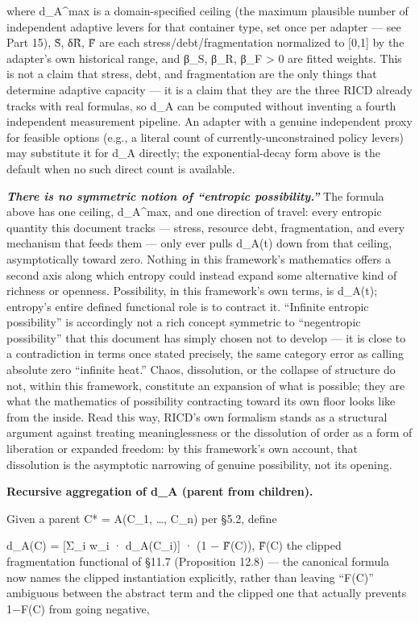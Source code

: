 \documentclass[
]{article}
\begin{document}
where d\_A\^{}max is a domain-specified ceiling (the maximum plausible
number of independent adaptive levers for that container type, set once
per adapter --- see Part 15), S̃, δR̃, F̃ are each
stress/debt/fragmentation normalized to {[}0,1{]} by the adapter's own
historical range, and β\_S, β\_R, β\_F \textgreater{} 0 are fitted
weights. This is not a claim that stress, debt, and fragmentation are
the only things that determine adaptive capacity --- it is a claim that
they are the three RICD already tracks with real formulas, so d\_A can
be computed without inventing a fourth independent measurement pipeline.
An adapter with a genuine independent proxy for feasible options (e.g.,
a literal count of currently-unconstrained policy levers) may substitute
it for d\_A directly; the exponential-decay form above is the default
when no such direct count is available.

\emph{\textbf{There is no symmetric notion of ``entropic
possibility.''}} The formula above has one ceiling, d\_A\^{}max, and one
direction of travel: every entropic quantity this document tracks ---
stress, resource debt, fragmentation, and every mechanism that feeds
them --- only ever pulls d\_A(t) down from that ceiling, asymptotically
toward zero. Nothing in this framework's mathematics offers a second
axis along which entropy could instead expand some alternative kind of
richness or openness. Possibility, in this framework's own terms, is
d\_A(t); entropy's entire defined functional role is to contract it.
``Infinite entropic possibility'' is accordingly not a rich concept
symmetric to ``negentropic possibility'' that this document has simply
chosen not to develop --- it is close to a contradiction in terms once
stated precisely, the same category error as calling absolute zero
``infinite heat.'' Chaos, dissolution, or the collapse of structure do
not, within this framework, constitute an expansion of what is possible;
they are what the mathematics of possibility contracting toward its own
floor looks like from the inside. Read this way, RICD's own formalism
stands as a structural argument against treating meaninglessness or the
dissolution of order as a form of liberation or expanded freedom: by
this framework's own account, that dissolution is the asymptotic
narrowing of genuine possibility, not its opening.

\textbf{Recursive aggregation of d\_A (parent from children).}

Given a parent C* = A(C\_1, \ldots, C\_n) per §5.2, define

d\_A(C) = {[}Σ\_i w\_i · d\_A(C\_i){]} · (1 − F̃(C)), F̃(C) the clipped
fragmentation functional of §11.7 (Proposition 12.8) --- the canonical
formula now names the clipped instantiation explicitly, rather than
leaving ``F(C)'' ambiguous between the abstract term and the clipped one
that actually prevents 1−F(C) from going negative,
\end{document}
